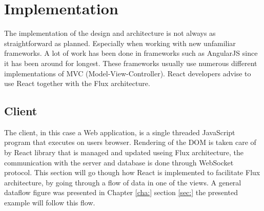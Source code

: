 \chapter{Implementation}\label{cha:implementation}
The implementation of the design and architecture is not always as straightforward as planned. Especially when working with new unfamiliar frameworks. A lot of work has been done in frameworks such as AngularJS since it has been around for longest. These frameworks usually use numerous different implementations of MVC (Model-View-Controller). React developers advise to use React together with the Flux architecture.
\section{Client}\label{sec:client}
The client, in this case a Web application, is a single threaded JavaScript program that executes on users browser. Rendering of the DOM is taken care of by React library that is managed and updated useing Flux architecture, the communication with the server and database is done through WebSocket protocol. This section will go though how React is implemented to facilitate Flux architecture, by going through a flow of data in one of the views. A general dataflow figure was presented in Chapter \ref{cha:} section \ref{sec:} the presented example will follow this flow.
